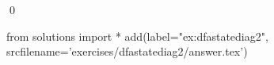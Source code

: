 
\begin{ex} 
  \label{ex:dfastatediag2}
  
  \qed
\end{ex} 
\begin{python0}
from solutions import *
add(label="ex:dfastatediag2",
    srcfilename='exercises/dfastatediag2/answer.tex') 
\end{python0}
